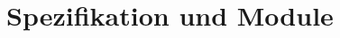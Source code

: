 \chapter{Spezifikation und Module}
\label{chap:spezifikation}


\renewcommand{\LARGE}{\large}


%





